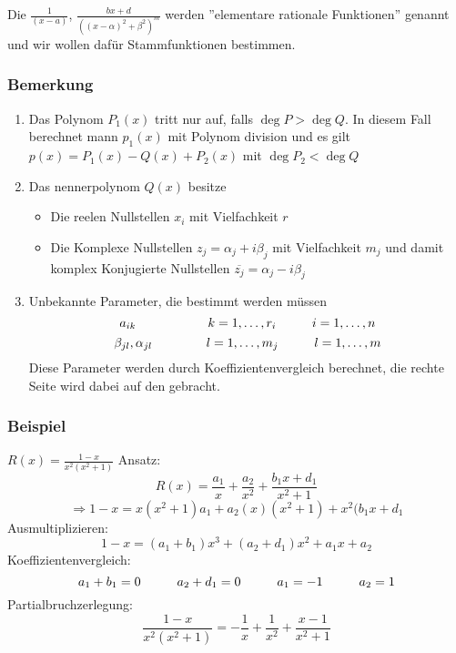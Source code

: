 Die $\frac{1}{(x-a)}$, $\frac{bx+d}{\left( (x-\alpha )^2 +\beta ^2\right)^m}$ werden ''elementare rationale Funktionen'' genannt und wir wollen dafür Stammfunktionen bestimmen.

\subsubsection*{Bemerkung}
\begin{enumerate}
\item Das Polynom $P_1(x)$ tritt nur auf, falls $\deg P>\deg Q$. In diesem Fall berechnet mann $p_1(x)$ mit Polynom division und es gilt $p(x)=P_1(x)-Q(x)+P_2(x)$ mit $\deg P_2 < \deg Q$
\item Das nennerpolynom $Q(x)$ besitze
\begin{itemize}
\item Die reelen Nullstellen $x_i$ mit Vielfachkeit $r$
\item Die Komplexe Nullstellen $z_j=\alpha _j+i\beta_j$ mit Vielfachkeit $m_j$ und damit komplex Konjugierte Nullstellen $\overline{z_j}=\alpha _j-i\beta _j$
\end{itemize}
\item Unbekannte Parameter, die bestimmt werden müssen
$$a_{ik}\text{\hspace{20mm}}k=1,\dots ,r_i\text{\hspace{10mm}}i=1,\dots,n$$
$$\beta _{jl},\alpha _{jl}\text{\hspace{15mm}}l=1,\dots ,m_j\text{\hspace{10mm}}l=1,\dots,m$$
Diese Parameter werden durch Koeffizientenvergleich berechnet, die rechte Seite wird dabei auf den  gebracht.
\end{enumerate}
\subsubsection{Beispiel}
$R(x)=\frac{1-x}{x^2(x^2+1)}$
Ansatz: $$R(x)=\frac{a_1}{x}+\frac{a_2}{x^2}+\frac{b_1x+d_1}{x^2+1}$$$$\Rightarrow 1-x=x(x^2+1)a_1+a_2(x)(x^2+1)+x^2(b_1x+d_1$$
Ausmultiplizieren:
$$1-x=(a_1+b_1)x^3+(a_2+d_1)x^2+a_1x+a_2$$
Koeffizientenvergleich:
$$a_1+b_1=0\text{\hspace{10mm}}a_2+d_1=0\text{\hspace{10mm}}a_1=-1\text{\hspace{10mm}}a_2=1$$
Partialbruchzerlegung:
$$\frac{1-x}{x^2(x^2+1)}=-\frac{1}{x}+\frac{1}{x^2}+\frac{x-1}{x^2+1}$$

